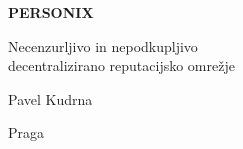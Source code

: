 \thispagestyle{empty}
\begin{center}
  {\sffamily\bfseries\fontsize{34}{40}\selectfont PERSONIX\par}
  \vspace{2.2em}
  {\rmfamily\large Necenzurljivo in nepodkupljivo\\[0.25em]
   decentralizirano reputacijsko omrežje\par}
\end{center}
\begin{center}
  {\rmfamily\Large Pavel Kudrna\par}
  \vspace{0.45em}
  {\rmfamily\small Praga\quad\textbullet{}\par}
\end{center}
\clearpage
